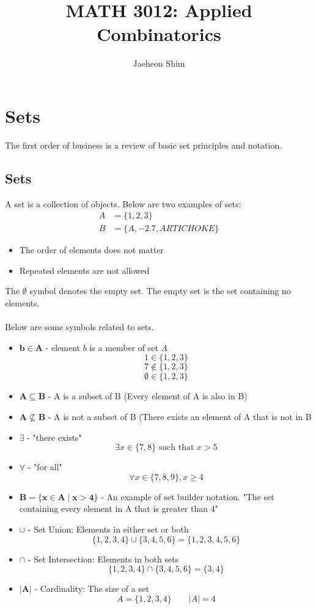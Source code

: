 \documentclass[12pt]{article}
\title{MATH 3012: Applied Combinatorics}
\author{Jaeheon Shim}
\date{}
\begin{document}
\pagestyle{fancy}

\maketitle
\thispagestyle{fancy}

\section{Sets}
The first order of business is a review of basic set principles and notation.
\subsection{Sets}

A set is a collection of objects. Below are two examples of sets:
\begin{align*}
	A &= \{1, 2, 3\} \\
	B &= \{A, -2.7, ARTICHOKE\}
\end{align*}
\begin{itemize}
	\item The order of elements does not matter
	\item Repeated elements are not allowed
\end{itemize}
The $\emptyset$ symbol denotes the empty set. The empty set is the set containing no elements.\\\\
Below are some symbols related to sets.
\begin{itemize}
	\item
		$\mathbf{b \in A}$ - element $b$ is a member of set $A$ \\
		$$1 \in \{1, 2, 3\}$$
		$$7 \not\in \{1, 2, 3\}$$
		$$\emptyset \in \{1, 2, 3\}$$
	\item
		$\mathbf{A \subseteq B}$ - A is a subset of B (Every element of A is also in B)
	\item
		$\mathbf{A \not\subseteq B}$ - A is not a subset of B (There exists an element of A that is not in B
	\item
		$\mathbf{\exists}$ - "there exists" \\
		$$\exists x \in \{7, 8\} \text{ such that } x > 5$$
	\item
		$\mathbf{\forall}$ - "for all" \\
		$$\forall x \in \{7, 8, 9\}, x \geq 4$$
	\item
		$\mathbf{B = \{x \in A \mid x > 4\}}$ - An example of set builder notation. "The set containing every element in A that is greater than 4"
	\item
		$\mathbf{\cup}$ - Set Union: Elements in either set or both\\
		$$ \{1, 2, 3, 4\} \cup \{3, 4, 5, 6\} = \{1, 2, 3, 4, 5, 6\} $$
	\item
		$\mathbf{\cap}$ - Set Intersection: Elements in both sets\\
		$$ \{1, 2, 3, 4\} \cap \{3, 4, 5, 6\} = \{3, 4\} $$
	\item
		$\mathbf{|A|}$ - Cardinality: The size of a set\\
		$$ A = \{1, 2, 3, 4\} \qquad |A| = 4$$
\end{itemize}
\end{document}
